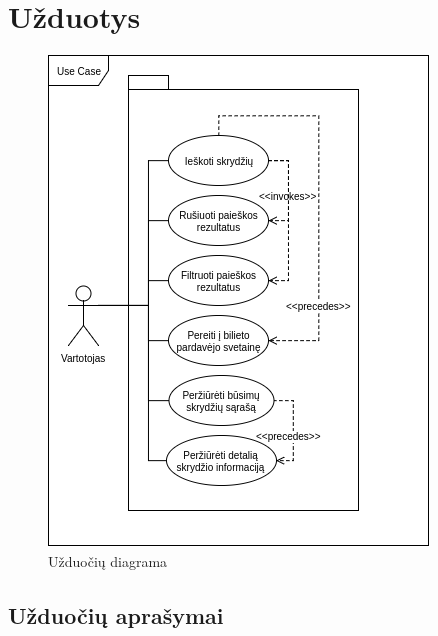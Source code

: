 \documentclass{VUMIFPSkursinis}
\begin{document}
        \section{Užduotys}
            \begin{figure}[H]
                \centering
                \includegraphics[scale=1]{img/use_case}
                \caption{Užduočių diagrama}
                \label{Užduočių diagrama}
            \end{figure}
            \subsection{Užduočių aprašymai}
                
\end{document}
